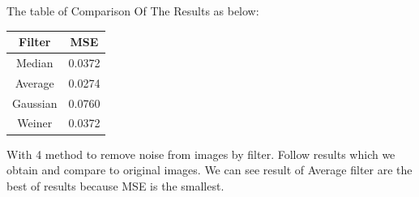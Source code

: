 \documentclass[10pt]{article}
\begin{document}
The table of Comparison Of The Results as below:

\begin{center}
\begin{tabular}{|c|c|}
	\hline 
	Filter & MSE \\ 
	\hline 
	Median & 0.0372 \\ 
	\hline 
	Average & 0.0274 \\ 
	\hline 
	Gaussian & 0.0760 \\ 
	\hline 
	Weiner & 0.0372 \\ 
	\hline 
\end{tabular} 
\end{center} 


With 4 method to remove noise from images by filter. Follow results which we obtain and compare to original images. We can see result of Average filter are the best of results because MSE is the smallest.
\end{document}

